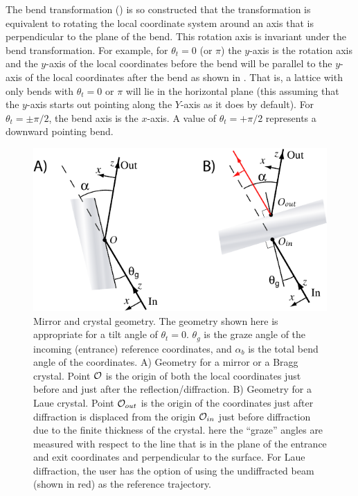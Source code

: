 The bend transformation () is so constructed that the
transformation is equivalent to rotating the local coordinate system
around an axis that is perpendicular to the plane of the bend. This
rotation axis is invariant under the bend transformation. For example,
for $\theta_t = 0$ (or $\pi$) the $y$-axis is the rotation axis and
the $y$-axis of the local coordinates before the bend will be parallel
to the $y$-axis of the local coordinates after the bend as shown in
. That is, a lattice with only bends with
$\theta_t = 0$ or $\pi$ will lie in the horizontal plane (this
assuming that the $y$-axis starts out pointing along the $Y$-axis as
it does by default).  For $\theta_t = \pm\pi/2$, the bend axis is the
$x$-axis. A value of $\theta_t = +\pi/2$ represents a downward
pointing bend.

\begin{figure}
  \centering \includegraphics{mirror.pdf} 
\caption[Mirror and crystal geometry] {Mirror and crystal geometry.
The geometry shown here is appropriate for a tilt angle of $\theta_t =
0$.  $\theta_g$ is the graze angle of the incoming (entrance)
reference coordinates, and $\alpha_b$ is the total bend angle of the
coordinates. A) Geometry for a mirror or a Bragg crystal. Point
${\cal O}$ is the origin of both the local coordinates just before and
just after the reflection/diffraction. B) Geometry for a Laue crystal.
Point ${\cal O}_{out}$ is the origin of the coordinates just after
diffraction is displaced from the origin ${\cal O}_{in}$ just before
diffraction due to the finite thickness of the crystal. here the
``graze'' angles are measured with respect to the line that is in the
plane of the entrance and exit coordinates and perpendicular to the
surface. For Laue diffraction, the user has the option of using the
undiffracted beam (shown in red) as the reference trajectory.
  }  
  \label{f:mirror}
\end{figure}

